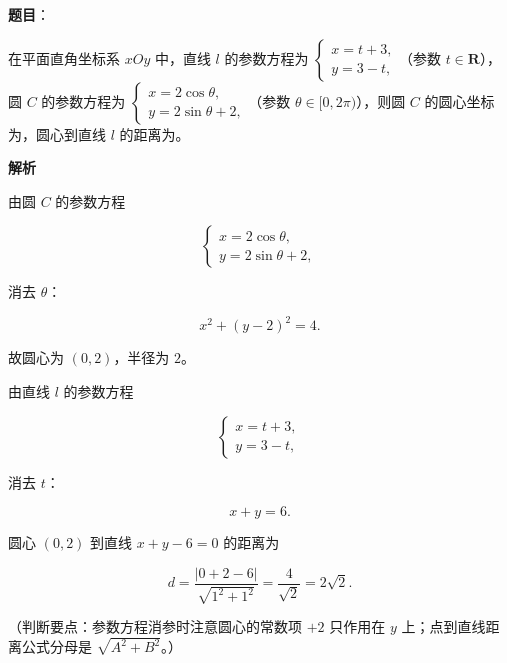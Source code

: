 \begin{answer}

\textbf{题目}：

在平面直角坐标系 $xOy$ 中，直线 $l$ 的参数方程为 $\begin{cases}x=t+3,\\ y=3-t,\end{cases}$（参数 $t\in\mathbf R$），圆 $C$ 的参数方程为 $\begin{cases}x=2\cos\theta,\\ y=2\sin\theta+2,\end{cases}$（参数 $\theta\in[0,2\pi)$），则圆 $C$ 的圆心坐标为\gkblank{}，圆心到直线 $l$ 的距离为\gkblank{}。

\textbf{解析}

由圆 $C$ 的参数方程

\nopagebreak[4]
\[\begin{cases}x=2\cos\theta,\\ y=2\sin\theta+2,\end{cases}\]

消去 $\theta$：

\nopagebreak[4]
\[x^2+(y-2)^2=4.\]

故圆心为 $(0,2)$，半径为 $2$。

由直线 $l$ 的参数方程

\nopagebreak[4]
\[\begin{cases}x=t+3,\\ y=3-t,\end{cases}\]

消去 $t$：

\nopagebreak[4]
\[x+y=6.\]

圆心 $(0,2)$ 到直线 $x+y-6=0$ 的距离为

\nopagebreak[4]
\[d=\frac{|0+2-6|}{\sqrt{1^2+1^2}}=\frac{4}{\sqrt2}=2\sqrt2.\]

（判断要点：参数方程消参时注意圆心的常数项 $+2$ 只作用在 $y$ 上；点到直线距离公式分母是 $\sqrt{A^2+B^2}$。）


\end{answer}
